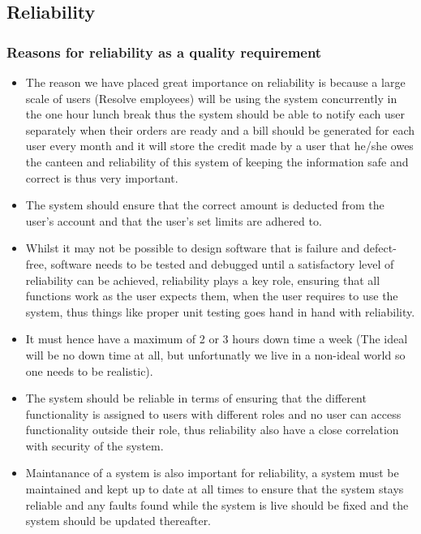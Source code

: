 \documentclass[a4paper,12pt]{article}
\begin{document}
\subsection{Reliability}
\subsubsection{Reasons for reliability as a quality requirement}
\begin{itemize}
\item The reason we have placed great importance on reliability is because a large scale of users (Resolve employees) will be using the system concurrently in the one hour lunch break thus the system should be able to notify each user separately when their orders are ready and a bill should be generated for each user every month and it  will store the credit made by a user that he/she owes the canteen and reliability of this system of keeping the information safe and correct is thus very important.
\item The system should ensure that the correct amount is deducted from the user's account and that the user's set limits are adhered to.
\item Whilst it may not be possible to design software that is failure and defect-free, software needs to be tested and debugged 
until a satisfactory level of reliability can be achieved, reliability plays a key role, ensuring that all functions work as the user expects them, when the user requires to use the system, thus things like proper unit testing goes hand in hand with reliability.
\item It must hence have a maximum of 2 or 3 hours down time a week (The ideal will be no down time at all, but unfortunatly we live in a non-ideal world so one needs to be realistic).
\item The system should be reliable in terms of ensuring that the different functionality is assigned to users with different roles and no user can access functionality outside their role, thus reliability also have a close correlation with security of the system.  
\item Maintanance of a system is also important for reliability, a system must be maintained and kept up to date at all times to ensure that the system stays reliable and any faults found while the system is live should be fixed and the system should be updated thereafter.
\end{itemize}
\end{document}
